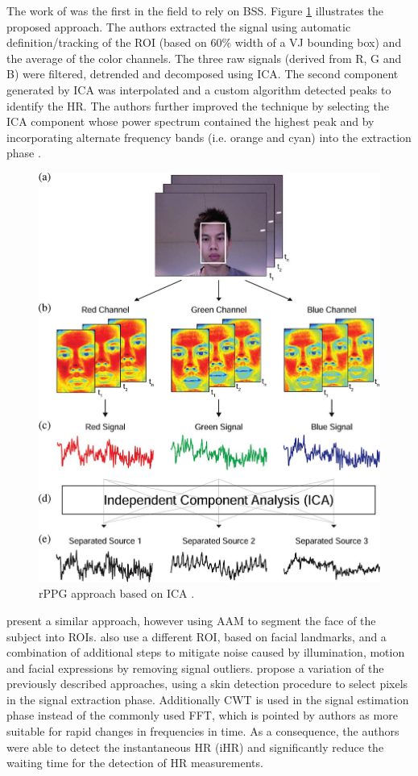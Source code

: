 The work of \textcite{poh2010non} was the first in the field to rely on BSS. Figure \ref{fig:poh} illustrates the proposed approach. The authors extracted the signal using automatic definition/tracking of the ROI (based on 60\% width of a VJ bounding box) and the average of the color channels. The three raw signals (derived from R, G and B) were filtered, detrended and decomposed using ICA. The second component generated by ICA was interpolated and a custom algorithm detected peaks to identify the HR. The authors further improved the technique by selecting the ICA component whose power spectrum contained the highest peak \parencite{poh2011advancements} and by incorporating alternate frequency bands (i.e. orange and cyan) into the extraction phase \parencite{mcduff2014improvements}.

\begin{figure}
\centering
\includegraphics[width=0.7\linewidth]{figures/poh.png}
\caption{rPPG approach based on ICA \parencite{poh2010non}.}
\label{fig:poh}
\end{figure}

\textcite{Datcu_2013} present a similar approach, however using AAM to segment the face of the subject into ROIs. \textcite{li2014remote} also use a different ROI, based on facial landmarks, and a combination of additional steps to mitigate noise caused by illumination, motion and facial expressions by removing signal outliers. \textcite{bousefsaf2013continuous} propose a variation of the previously described approaches, using a skin detection procedure to select pixels in the signal extraction phase. Additionally CWT is used in the signal estimation phase instead of the commonly used FFT, which is pointed by authors as more suitable for rapid changes in frequencies in time. As a consequence, the authors were able to detect the instantaneous HR (iHR) and significantly reduce the waiting time for the detection of HR measurements.

